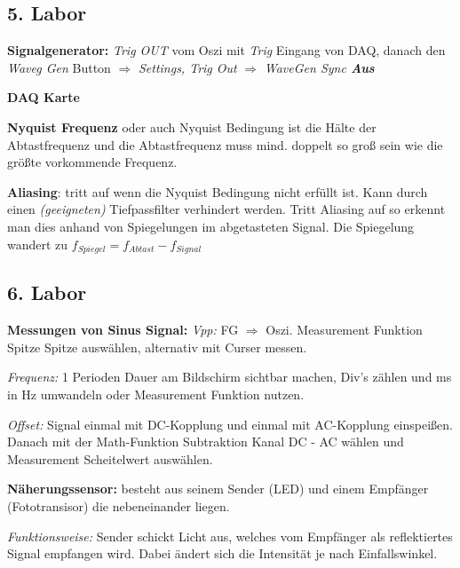 \documentclass{article}
\begin{document}
\subsection*{5. Labor }
\textbf{Signalgenerator:} \textit{Trig OUT} vom Oszi mit \textit{Trig} Eingang von DAQ, danach den \textit{Waveg Gen} Button \(\Rightarrow\) \textit{Settings, Trig Out} \(\Rightarrow\) \textit{WaveGen Sync \textbf{Aus}} 

\textbf{DAQ Karte} 

\textbf{Nyquist Frequenz} oder auch Nyquist Bedingung ist die Hälte der Abtastfrequenz und die Abtastfrequenz muss mind. doppelt so groß sein wie die größte vorkommende Frequenz. 

\textbf{Aliasing}: tritt auf wenn die Nyquist Bedingung nicht erfüllt ist. Kann durch einen \textit{(geeigneten)} Tiefpassfilter verhindert werden.  %
Tritt Aliasing auf so erkennt man dies anhand von Spiegelungen im abgetasteten Signal. Die Spiegelung wandert zu \(f_{Spiegel} =  f_{Abtast} - f_{Signal} \)

\subsection*{6. Labor }

\textbf{Messungen von Sinus Signal:}
\textit{Vpp:} FG \( \Rightarrow \) Oszi. Measurement Funktion Spitze Spitze auswählen, alternativ mit Curser messen.

\textit{Frequenz:} 1 Perioden Dauer am Bildschirm sichtbar machen, Div's zählen und ms in Hz umwandeln oder Measurement Funktion nutzen. 

\textit{Offset:} Signal einmal mit DC-Kopplung  und einmal mit AC-Kopplung einspeißen. Danach mit der Math-Funktion Subtraktion Kanal DC - AC wählen  und Measurement Scheitelwert auswählen. 

\textbf{Näherungssensor:} besteht aus seinem Sender (LED) und einem Empfänger (Fototransisor) die nebeneinander liegen. 

\textit{Funktionsweise:} Sender schickt Licht aus, welches vom Empfänger als reflektiertes Signal empfangen wird. Dabei ändert sich die Intensität je nach Einfallswinkel. 
\end{document}
